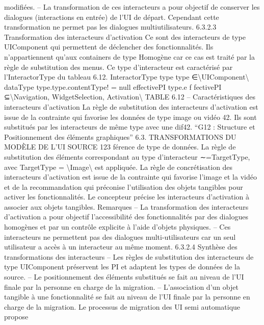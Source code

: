\documentclass{article}
\begin{document}
modiﬁ\'{e}es.
– La transformation de ces interacteurs a pour objectif de conserver les dialogues (interactions
en entr\'{e}e) de l’UI de d\'{e}part. Cependant cette transformation ne permet pas les dialogues multiutilisateurs.
6.3.2.3
Transformation des interacteurs d’activation
Ce sont des interacteurs de type UIComponent qui permettent de d\'{e}clencher des fonctionnalit\'{e}s.
Ils n’appartiennent qu’aux containers de type Homog\`{e}ne car ce cas est trait\'{e} par la r\`{e}gle de substitution
des menus. Ce type d’interacteur est caract\'{e}ris\'{e} par l’InteractorType du tableau 6.12.
InteractorType
type
type ∈\textbackslash{}{UIComponent\textbackslash{}}
dataType
type.type.contentType! = null
effectivePI
type.e f fectivePI ⊆\textbackslash{}{Navigation, WidgetSelection, Activation\textbackslash{}}
TABLE 6.12 – Caract\'{e}ristiques des interacteurs d’activation
La r\`{e}gle de substitution des interacteurs d’activation
est issue de la contrainte qui favorise les
donn\'{e}es de type image ou vid\'{e}o 42. Ils sont substitu\'{e}s par les interacteurs de m\^{e}me type avec une dif42. “G12 : Structure et Positionnement des \'{e}l\'{e}ments graphiques”
6.3. TRANSFORMATIONS DU MODÈLE DE L’UI SOURCE
123
f\'{e}rence de type de donn\'{e}es. La r\`{e}gle de substitution des \'{e}l\'{e}ments correspondant au type d’interacteur
∼=TargetType, avec TargetType = \textbackslash{}{Image\textbackslash{}} est appliqu\'{e}e.
La r\`{e}gle de concr\'{e}tisation des interacteurs d’activation
est issue de la contrainte qui favorise
l’image et la vid\'{e}o et de la recommandation qui pr\'{e}conise l’utilisation des objets tangibles pour activer
les fonctionnalit\'{e}s. Le concepteur pr\'{e}cise les interacteurs d’activation \`{a} associer aux objets tangibles.
Remarques
– La transformation des interacteurs d’activation a pour objectif l’accessibilit\'{e} des fonctionnalit\'{e}s
par des dialogues homog\`{e}nes et par un contr\^{o}le explicite \`{a} l’aide d’objets physiques.
– Ces interacteurs ne permettent pas des dialogues multi-utilisateurs car un seul utilisateur a acc\`{e}s
\`{a} un interacteur au m\^{e}me moment.
6.3.2.4
Synth\`{e}se des transformations des interacteurs
– Les r\`{e}gles de substitution des interacteurs de type UIComponent pr\'{e}servent les PI et adaptent
les types de donn\'{e}es de la source.
– Le positionnement des \'{e}l\'{e}ments substitu\'{e}s se fait au niveau de l’UI ﬁnale par la personne en
charge de la migration.
– L’association d’un objet tangible \`{a} une fonctionnalit\'{e} se fait au niveau de l’UI ﬁnale par la
personne en charge de la migration. Le processus de migration des UI semi automatique propose
\end{document}
